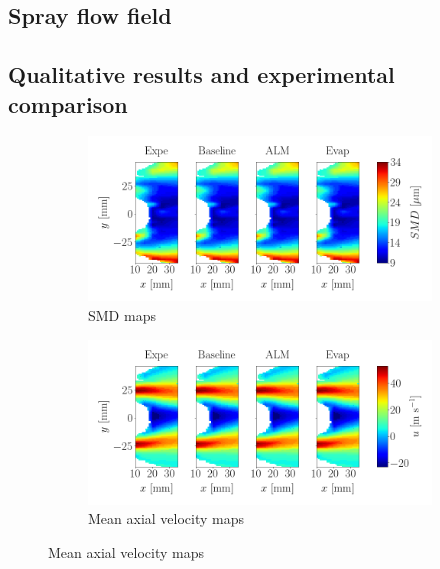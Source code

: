 \subsection{Spray flow field}

\subsection{Qualitative results and experimental comparison}

\clearpage

\begin{figure}[h!]
\centering
\begin{subfigure}[b]{1.0\textwidth}
	\centering 
	\includegraphics[scale=0.4]{./part3_applications/figures_ch9_lagrangian/simus_expe_validation/subplots_maps_SMD.png}
   \caption{SMD maps}
\end{subfigure}

\vspace*{0.1in}

\begin{subfigure}[b]{1.0\textwidth}
	\centering
	\includegraphics[scale=0.4]{./part3_applications/figures_ch9_lagrangian/simus_expe_validation/subplots_maps_axial_velocity.png}
   \caption{Mean axial velocity maps}
\end{subfigure}


\end{figure}
